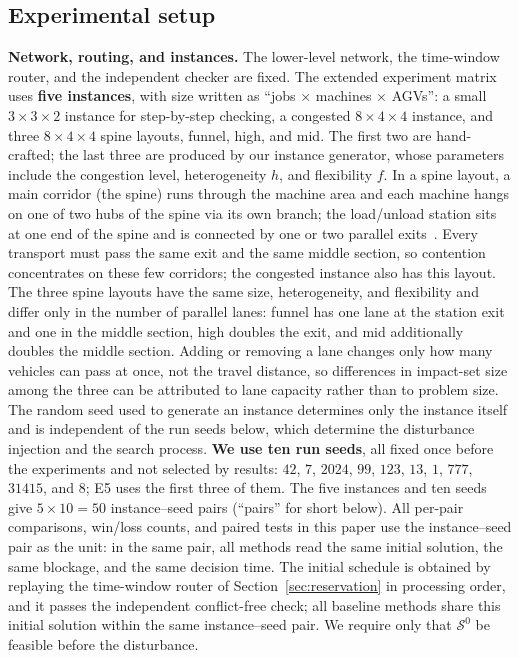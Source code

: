 \documentclass[manuscript,screen,review]{acmart}
\newcommand{\NInst}{5}
\newcommand{\NSeeds}{10}
\newcommand{\NPairs}{50}
\begin{document}
\subsection{Experimental setup}
\label{sec:protocol}

\textbf{Network, routing, and instances.}
The lower-level network, the time-window router, and the independent checker are fixed. The extended experiment matrix uses \textbf{five instances}, with size written as ``jobs \(\times\) machines \(\times\) AGVs'':
a small \(3\times3\times2\) instance for step-by-step checking, a congested \(8\times4\times4\) instance,
and three \(8\times4\times4\) spine layouts, funnel, high, and mid.
The first two are hand-crafted; the last three are produced by our instance generator, whose parameters include the congestion level, heterogeneity \(h\), and flexibility \(f\).
In a spine layout, a main corridor (the spine) runs through the machine area and each machine hangs on one of two hubs of the spine via its own branch;
the load/unload station sits at one end of the spine and is connected by one or two parallel exits~\cite{suh2022spine}.
Every transport must pass the same exit and the same middle section, so contention concentrates on these few corridors; the congested instance also has this layout.
The three spine layouts have the same size, heterogeneity, and flexibility and differ only in the number of parallel lanes:
funnel has one lane at the station exit and one in the middle section, high doubles the exit, and mid additionally doubles the middle section.
Adding or removing a lane changes only how many vehicles can pass at once, not the travel distance, so differences in impact-set size among the three can be attributed to lane capacity rather than to problem size.
The random seed used to generate an instance determines only the instance itself and is independent of the run seeds below, which determine the disturbance injection and the search process.
\textbf{We use ten run seeds}, all fixed once before the experiments and not selected by results: \(42\), \(7\), \(2024\), \(99\), \(123\), \(13\), \(1\),
\(777\), \(31415\), and \(8\); E5 uses the first three of them.
The five instances and ten seeds give \(\NInst\times\NSeeds=\NPairs\) instance--seed pairs (``pairs'' for short below).
All per-pair comparisons, win/loss counts, and paired tests in this paper use the instance--seed pair as the unit:
in the same pair, all methods read the same initial solution, the same blockage, and the same decision time.
The initial schedule is obtained by replaying the time-window router of Section~\ref{sec:reservation} in processing order,
and it passes the independent conflict-free check; all baseline methods share this initial solution within the same instance--seed pair.
We require only that \(\mathcal{S}^0\) be feasible before the disturbance.
\end{document}
